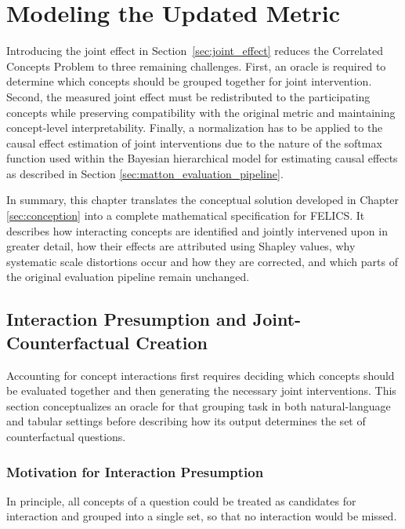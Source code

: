 \chapter{Modeling the Updated Metric}
\label{sec:modeling_updated_metric}
Introducing the joint effect in Section~\ref{sec:joint_effect} reduces the Correlated Concepts Problem to three remaining challenges. First, an oracle is required to determine which concepts should be grouped together for joint intervention. Second, the measured joint effect must be redistributed to the participating concepts while preserving compatibility with the original metric and maintaining concept-level interpretability. Finally, a normalization has to be applied to the causal effect estimation of joint interventions due to the nature of the softmax function used within the Bayesian hierarchical model for estimating causal effects as described in Section \ref{sec:matton_evaluation_pipeline}.

In summary, this chapter translates the conceptual solution developed in Chapter \ref{sec:conception} into a complete mathematical specification for FELICS. It describes how interacting concepts are identified and jointly intervened upon in greater detail, how their effects are attributed using Shapley values, why systematic scale distortions occur and how they are corrected, and which parts of the original evaluation pipeline remain unchanged.

\section{Interaction Presumption and Joint-Counterfactual Creation}
\label{sec:joint_counterfactual}
Accounting for concept interactions first requires deciding which concepts should be evaluated together and then generating the necessary joint interventions. This section conceptualizes an oracle for that grouping task in both natural-language and tabular settings before describing how its output determines the set of counterfactual questions.

\subsection{Motivation for Interaction Presumption}
\label{sec:correlation_identification_motivation}
In principle, all concepts of a question could be treated as candidates for interaction and grouped into a single set, so that no interaction would be missed.

